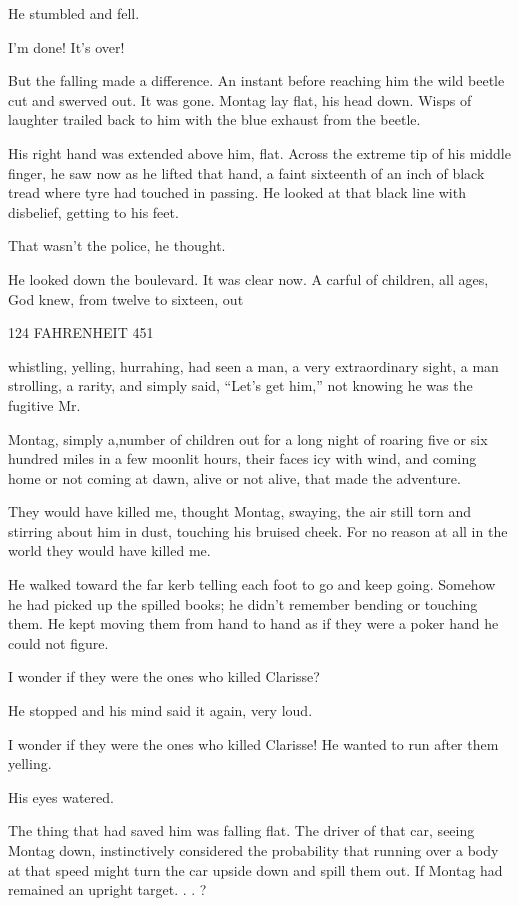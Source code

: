 \documentclass[11pt,openany]{book}
\begin{document}
He stumbled and fell.

I'm done! It's over!

But the falling made a difference. An instant before reaching him the wild beetle cut and swerved out. It was gone. Montag lay flat, his head down. Wisps of laughter trailed back to him with the blue exhaust from the beetle.

His right hand was extended above him, flat. Across the extreme tip of his middle finger, he saw now as he lifted that hand, a faint sixteenth of an inch of black tread where tyre had touched in passing. He looked at that black line with disbelief, getting to his feet.

That wasn't the police, he thought.

He looked down the boulevard. It was clear now. A carful of children, all ages, God knew, from twelve to sixteen, out

124 FAHRENHEIT 451

whistling, yelling, hurrahing, had seen a man, a very extraordinary sight, a man strolling, a rarity, and simply said, ``Let's get him,'' not knowing he was the fugitive Mr.

Montag, simply a,number of children out for a long night of roaring five or six hundred miles in a few moonlit hours, their faces icy with wind, and coming home or not coming at dawn, alive or not alive, that made the adventure.

They would have killed me, thought Montag, swaying, the air still torn and stirring about him in dust, touching his bruised cheek. For no reason at all in the world they would have killed me.

He walked toward the far kerb telling each foot to go and keep going. Somehow he had picked up the spilled books; he didn't remember bending or touching them. He kept moving them from hand to hand as if they were a poker hand he could not figure.

I wonder if they were the ones who killed Clarisse?

He stopped and his mind said it again, very loud.

I wonder if they were the ones who killed Clarisse! He wanted to run after them yelling.

His eyes watered.

The thing that had saved him was falling flat. The driver of that car, seeing Montag down, instinctively considered the probability that running over a body at that speed might turn the car upside down and spill them out. If Montag had remained an upright target. . . ?
\end{document}
